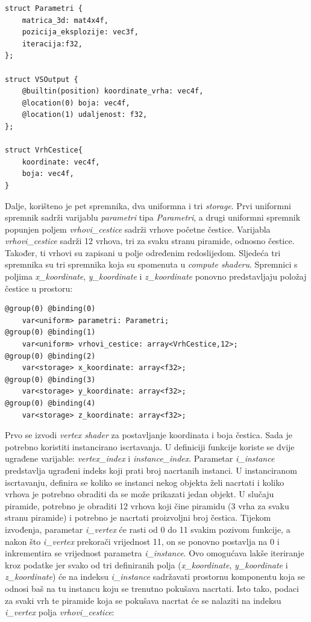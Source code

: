 \documentclass{foi}
\begin{document}
\begin{verbatim}
struct Parametri {
	matrica_3d: mat4x4f,
	pozicija_eksplozije: vec3f,
	iteracija:f32,
};

struct VSOutput {
	@builtin(position) koordinate_vrha: vec4f,
	@location(0) boja: vec4f,
	@location(1) udaljenost: f32,
};

struct VrhCestice{
	koordinate: vec4f,
	boja: vec4f,
}
\end{verbatim} 


Dalje, korišteno je pet spremnika, dva uniformna i tri \textit{storage}. Prvi uniformni spremnik sadrži varijablu \textit{parametri} tipa \textit{Parametri}, a drugi uniformni spremnik popunjen poljem \textit{vrhovi\_cestice} sadrži vrhove početne čestice. Varijabla \textit{vrhovi\_cestice} sadrži 12 vrhova, tri za svaku stranu piramide, odnosno čestice. Također, ti vrhovi su zapisani u polje određenim redoslijedom. Sljedeća tri spremnika su tri spremnika koja su spomenuta u \textit{compute shaderu}. Spremnici s poljima \textit{x\_koordinate}, \textit{y\_koordinate} i \textit{z\_koordinate} ponovno predstavljaju položaj čestice u prostoru:

\begin{verbatim}
@group(0) @binding(0) 
	var<uniform> parametri: Parametri;
@group(0) @binding(1) 
	var<uniform> vrhovi_cestice: array<VrhCestice,12>;
@group(0) @binding(2) 
	var<storage> x_koordinate: array<f32>;
@group(0) @binding(3) 
	var<storage> y_koordinate: array<f32>;
@group(0) @binding(4)
	var<storage> z_koordinate: array<f32>;

\end{verbatim} 


Prvo se izvodi \textit{vertex shader} za postavljanje koordinata i boja čestica. Sada je potrebno koristiti instancirano iscrtavanja. U definiciji funkcije koriste se dvije ugrađene varijable: \textit{vertex\_index} i \textit{instance\_index}. Parametar \textit{i\_instance} predstavlja ugrađeni indeks koji prati broj nacrtanih instanci. U instanciranom iscrtavanju, definira se koliko se instanci nekog objekta želi nacrtati i koliko vrhova je potrebno obraditi da se može prikazati jedan objekt. U slučaju piramide, potrebno je obraditi 12 vrhova koji čine piramidu (3 vrha za svaku stranu piramide) i potrebno je nacrtati proizvoljni broj čestica. Tijekom izvođenja, parametar \textit{i\_vertex} će rasti od 0 do 11 svakim pozivom funkcije, a nakon što \textit{i\_vertex} prekorači vrijednost 11, on se ponovno postavlja na 0 i inkrementira se vrijednost parametra \textit{i\_instance}. Ovo omogućava lakše iteriranje kroz podatke jer svako od tri definiranih polja (\textit{x\_koordinate}, \textit{y\_koordinate} i \textit{z\_koordinate}) će na indeksu \textit{i\_instance} sadržavati prostornu komponentu koja se odnosi baš na tu instancu koju se trenutno pokušava nacrtati. Isto tako, podaci za svaki vrh te piramide koja se pokušava nacrtat će se nalaziti na indeksu \textit{i\_vertex} polja \textit{vrhovi\_cestice}:
\end{document}
